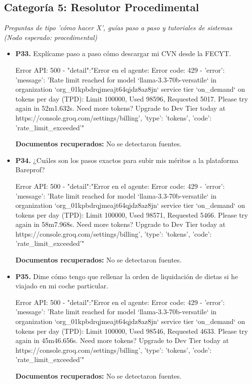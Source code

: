 \documentclass{article}
\begin{document}
\subsection{Categoría 5: Resolutor Procedimental}
\textit{Preguntas de tipo 'cómo hacer X', guías paso a paso y tutoriales de sistemas (Nodo esperado: procedimental)}
\begin{itemize}
  \item \textbf{P33.} Explícame paso a paso cómo descargar mi CVN desde la FECYT. \\
    \begin{respuesta_agente}
      Error API: 500 - {"detail":"Error en el agente: Error code: 429 - {'error': {'message': 'Rate limit reached for model `llama-3.3-70b-versatile` in organization `org_01kpbdrqjmeajt64qjdz8az8jn` service tier `on_demand` on tokens per day (TPD): Limit 100000, Used 98596, Requested 5017. Please try again in 52m1.632s. Need more tokens? Upgrade to Dev Tier today at https://console.groq.com/settings/billing', 'type': 'tokens', 'code': 'rate_limit_exceeded'}}"}
    \end{respuesta_agente}
    \vspace{0.2cm}
    \noindent\textbf{Documentos recuperados:} No se detectaron fuentes.

  \item \textbf{P34.} ¿Cuáles son los pasos exactos para subir mis méritos a la plataforma Bareprof? \\
    \begin{respuesta_agente}
      Error API: 500 - {"detail":"Error en el agente: Error code: 429 - {'error': {'message': 'Rate limit reached for model `llama-3.3-70b-versatile` in organization `org_01kpbdrqjmeajt64qjdz8az8jn` service tier `on_demand` on tokens per day (TPD): Limit 100000, Used 98571, Requested 5466. Please try again in 58m7.968s. Need more tokens? Upgrade to Dev Tier today at https://console.groq.com/settings/billing', 'type': 'tokens', 'code': 'rate_limit_exceeded'}}"}
    \end{respuesta_agente}
    \vspace{0.2cm}
    \noindent\textbf{Documentos recuperados:} No se detectaron fuentes.

  \item \textbf{P35.} Dime cómo tengo que rellenar la orden de liquidación de dietas si he viajado en mi coche particular. \\
    \begin{respuesta_agente}
      Error API: 500 - {"detail":"Error en el agente: Error code: 429 - {'error': {'message': 'Rate limit reached for model `llama-3.3-70b-versatile` in organization `org_01kpbdrqjmeajt64qjdz8az8jn` service tier `on_demand` on tokens per day (TPD): Limit 100000, Used 98546, Requested 4633. Please try again in 45m46.656s. Need more tokens? Upgrade to Dev Tier today at https://console.groq.com/settings/billing', 'type': 'tokens', 'code': 'rate_limit_exceeded'}}"}
    \end{respuesta_agente}
    \vspace{0.2cm}
    \noindent\textbf{Documentos recuperados:} No se detectaron fuentes.


\end{itemize}
\end{document}

